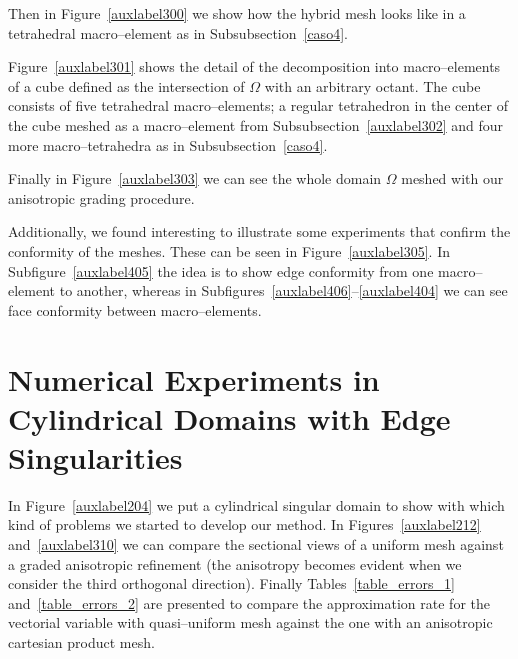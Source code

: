Then in Figure~\ref{auxlabel300} we show how the hybrid mesh 
looks like in a tetrahedral
macro--element as in Subsubsection~\ref{caso4}. 


Figure~\ref{auxlabel301} shows the detail of the decomposition into macro--elements
of a cube defined as the intersection of $\Omega$ with an arbitrary octant. The 
cube consists of five tetrahedral macro--elements; a regular tetrahedron
in the center of the cube meshed as a macro--element from 
Subsubsection~\ref{auxlabel302} and four more macro--tetrahedra as in 
Subsubsection~\ref{caso4}.

\tauOneEnCube

Finally in Figure~\ref{auxlabel303} we can see the whole domain $\Omega$
meshed with our anisotropic grading procedure.

\tauOneEn
Additionally, we found interesting to illustrate some experiments
that confirm the conformity of the meshes. These can be seen in 
Figure~\ref{auxlabel305}. In Subfigure~\ref{auxlabel405} the idea is
to show edge conformity from one macro--element to another, whereas 
in Subfigures~\ref{auxlabel406}--\ref{auxlabel404} we can see
face conformity between macro--elements.

\conform
\section{Numerical 
Experiments in Cylindrical Domains with Edge Singularities}
\label{auxlabel215}

In Figure~\ref{auxlabel204} we put a cylindrical singular domain to show
with which kind of problems we started to develop our method.
\edgedomain
In Figures~\ref{auxlabel212} and~\ref{auxlabel310} we can
compare the sectional views of a uniform mesh against
a graded anisotropic refinement (the anisotropy becomes evident
when we consider the third orthogonal direction).
\unifSection
\gradSection
Finally Tables~\ref{table_errors_1} and~\ref{table_errors_2}
are presented to compare the approximation rate for the vectorial variable
with quasi--uniform mesh against the one with an anisotropic
cartesian product mesh.
\tableErrorsUniformCylinder 
\tableErrorsAnisoCylinder 


%
%